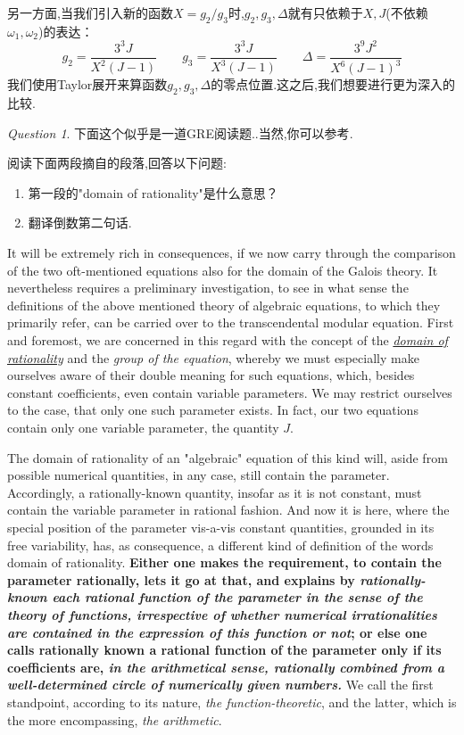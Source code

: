 \documentclass[12pt,A4paper,oneside]{amsart}
\numberwithin{equation}{section}
\theoremstyle{plain}
\theoremstyle{plain}
\theoremstyle{plain}
\numberwithin{equation}{section}
\theoremstyle{remark}
\newtheorem{question}[theorem]{Question}
\begin{document}
另一方面,当我们引入新的函数$X=g_2/g_3$时,$g_2,g_3,\Delta$就有只依赖于$X,J$(不依赖$\omega_1,\omega_2$)的表达：
$$g_2=\frac{3^3J}{X^2(J-1)}\qquad g_3=\frac{3^3J}{X^3(J-1)}\qquad \Delta=\frac{3^9J^2}{X^6(J-1)^3}$$
我们使用Taylor展开来算函数$g_2,g_3,\Delta$的零点位置.这之后,我们想要进行更为深入的比较.
\pagebreak
\begin{question}
	下面这个似乎是一道GRE阅读题..当然,你可以参考\cite[I.Chapter 4]{klein2003lectures}.
	
	阅读下面两段摘自\cite[I,4.10]{klein1892vorlesungen}的段落,回答以下问题:
	\begin{enumerate}
		\item 第一段的"domain of rationality"是什么意思？
		\item 翻译倒数第二句话.
	\end{enumerate}
	It will be extremely rich in consequences, if we now carry through the comparison of
	the two oft-mentioned equations also for the domain of the Galois theory. It nevertheless requires a preliminary investigation, to see in what sense the definitions of the
	above mentioned theory of algebraic equations, to which they primarily refer, can be carried over to the transcendental modular equation. First and foremost, we are concerned in this regard with the concept of the \underline{\textit{domain of rationality}} and the \textit{group of the equation}, whereby we must especially make ourselves aware of their double meaning
	for such equations, which, besides constant coefficients, even contain variable parameters. We may restrict ourselves to the case, that only one such parameter exists. In fact,
	our two equations contain only one variable parameter, the quantity $J$.
	
	The domain of rationality of an "algebraic" equation of this kind will, aside from
	possible numerical quantities, in any case, still contain the parameter. Accordingly, a rationally-known quantity, insofar as it is not constant, must contain the variable
	parameter in rational fashion. And now it is here, where the special position of the parameter vis-a-vis constant quantities, grounded in its free variability, has, as consequence, a different kind of definition of the words domain of rationality. \textbf{Either one makes the requirement, to contain the parameter rationally, lets it go at that,
		and explains by \textit{rationally-known each rational function of the parameter in the sense of the theory of functions, irrespective of whether numerical irrationalities are contained in the expression of this function or not}; or else one calls rationally known a rational function of the parameter only if its coefficients are, \textit{in the arithmetical sense, rationally combined from a well-determined circle of numerically given numbers.}} We call the first standpoint, according to its nature, \textit{the function-theoretic}, and the latter, which is the more encompassing, \textit{the arithmetic}.

\end{question}
\end{document}
